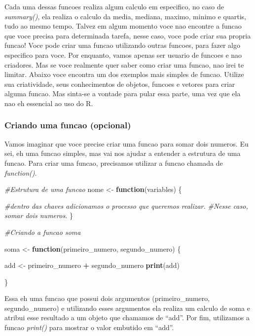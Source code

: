 \documentclass[
]{book}
\newenvironment{Shaded}{\begin{snugshade}}{\end{snugshade}}
\newcommand{\CommentTok}[1]{\textcolor[rgb]{0.56,0.35,0.01}{\textit{#1}}}
\newcommand{\ControlFlowTok}[1]{\textcolor[rgb]{0.13,0.29,0.53}{\textbf{#1}}}
\newcommand{\FunctionTok}[1]{\textcolor[rgb]{0.13,0.29,0.53}{\textbf{#1}}}
\newcommand{\NormalTok}[1]{#1}
\newcommand{\OtherTok}[1]{\textcolor[rgb]{0.56,0.35,0.01}{#1}}
\newcommand{\SpecialCharTok}[1]{\textcolor[rgb]{0.81,0.36,0.00}{\textbf{#1}}}
\begin{document}
Cada uma dessas funcoes realiza algum calculo em especifico, no caso de \emph{summary()}, ela realiza o calculo da media, mediana, maximo, minimo e quartis, tudo ao mesmo tempo. Talvez em algum momento voce nao encontre a funcao que voce precisa para determinada tarefa, nesse caso, voce pode criar sua propria funcao! Voce pode criar uma funcao utilizando outras funcoes, para fazer algo especifico para voce. Por enquanto, vamos apenas ser usuario de funcoes e nao criadores. Mas se voce realmente quer saber como criar uma funcao, nao irei te limitar. Abaixo voce encontra um dos exemplos mais simples de funcao. Utilize sua criatividade, seus conhecimentos de objetos, funcoes e vetores para criar alguma funcao. Mas sinta-se a vontade para pular essa parte, uma vez que ela nao eh essencial ao uso do R.

\hypertarget{criando-uma-funcao-opcional}{%
\subsubsection{Criando uma funcao (opcional)}\label{criando-uma-funcao-opcional}}

Vamos imaginar que voce precise criar uma funcao para somar dois numeros. Eu sei, eh uma funcao simples, mas vai nos ajudar a entender a estrutura de uma funcao. Para criar uma funcao, precisamos utilizar a funcao chamada de \emph{function()}.

\begin{Shaded}
\begin{Highlighting}[]
\CommentTok{\#Estrutura de uma funcao}
\NormalTok{nome }\OtherTok{\textless{}{-}} \ControlFlowTok{function}\NormalTok{(variables) \{}
    
    \CommentTok{\#dentro das chaves adicionamos o processo que queremos realizar.}
    \CommentTok{\#Nesse caso, somar dois numeros.}
\NormalTok{\}}

\CommentTok{\#Criando a funcao soma}

\NormalTok{soma }\OtherTok{\textless{}{-}} \ControlFlowTok{function}\NormalTok{(primeiro\_numero, segundo\_numero) \{}

\NormalTok{add }\OtherTok{\textless{}{-}}\NormalTok{ primeiro\_numero }\SpecialCharTok{+}\NormalTok{ segundo\_numero}
\FunctionTok{print}\NormalTok{(add)}

\NormalTok{\}}
\end{Highlighting}
\end{Shaded}

Essa eh uma funcao que possui dois argumentos (primeiro\_numero, segundo\_numero) e utilizando esses argumentos ela realiza um calculo de soma e atribui esse resultado a um objeto que chamamos de ``add''. Por fim, utilizamos a funcao \emph{print()} para mostrar o valor embutido em ``add''.
\end{document}
